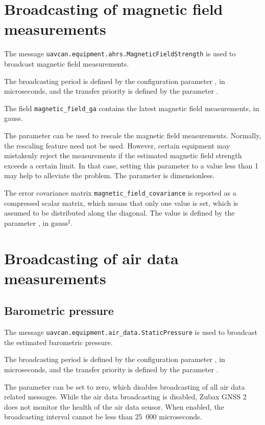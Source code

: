 \documentclass{zubaxdoc}
\begin{document}
\section{Broadcasting of magnetic field measurements}

The message \verb|uavcan.equipment.ahrs.MagneticFieldStrength| is used to broadcast magnetic field measurements.

The broadcasting period is defined by the configuration
parameter , in microseconds, and the transfer priority is defined by the
parameter .

The field \verb|magnetic_field_ga| contains the latest magnetic field measurements, in gauss.

The parameter  can be used to rescale the magnetic field measurements.
Normally, the rescaling feature need not be used.
However, certain equipment may mistakenly reject the measurements if the estimated
magnetic field strength exceeds a certain limit. In that case, setting this parameter to a value
less than 1 may help to alleviate the problem.
The parameter is dimensionless.

The error covariance matrix \verb|magnetic_field_covariance| is reported as a compressed scalar matrix,
which means that only one value is set, which is assumed to be distributed along the diagonal.
The value is defined by the parameter , in $\text{gauss}^2$.

\section{Broadcasting of air data measurements}

\subsection{Barometric pressure}

The message \verb|uavcan.equipment.air_data.StaticPressure| is used to broadcast the
estimated barometric pressure.

The broadcasting period is defined by the configuration
parameter , in microseconds, and the transfer priority is defined by the
parameter .

The parameter  can be set to zero, which disables broadcasting of all
air data related messages.
While the air data broadcasting is disabled, Zubax GNSS 2 does not monitor the health of the
air data sensor.
When enabled, the broadcasting interval cannot be less than 25~000 microseconds.
\end{document}

